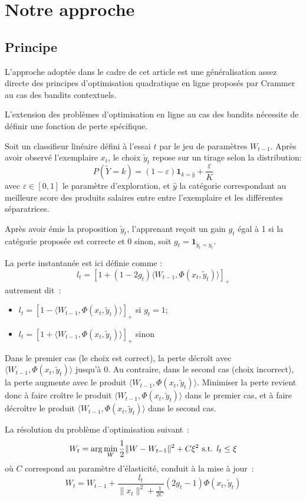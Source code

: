 \documentclass[twocolumn]{article}
\begin{document}
\section{Notre approche}

\subsection{Principe}
L'approche adoptée dans le cadre de cet article est une généralisation assez directe des principes d'optimisation quadratique en ligne proposés par Crammer au cas des bandits contextuels. 

L'extension des problèmes d'optimisation en ligne au cas des bandits nécessite de définir une fonction de perte spécifique. 

Soit un classifieur linéaire défini à l'essai $t$ par le jeu de paramètres $W_{t-1}$. Après avoir observé l'exemplaire $x_t$, le choix $\tilde{y}_t$ repose sur un tirage selon la distribution: $$P(\tilde{Y}=k) = (1 - \varepsilon) \mathbf{1}_{k = \hat{y}} + \frac{\varepsilon}{K} $$ avec $\varepsilon \in [0,1]$ le paramètre d'exploration, et $\hat{y}$ la catégorie correspondant au meilleure score des produits salaires entre entre l'exemplaire et les différentes séparatrices.  

Après avoir émis la proposition $\tilde{y}_t$, l'apprenant reçoit un gain $g_t$ égal à 1 si la catégorie proposée est correcte et 0 sinon, soit $g_t = \mathbf{1}_{\tilde{y}_t=y_t}$. 

La perte instantanée est ici définie comme :
$$l_t = [1 + (1 - 2 g_t) \langle W_{t-1}, \Phi(x_t,\tilde{y}_t)\rangle]_+$$
autrement dit~:
\begin{itemize}
	\item[] $l_t = [1 - \langle W_{t-1}, \Phi(x_t,\tilde{y}_t)\rangle]_+$ si $g_t=1$;
	\item[] $l_t = [1 + \langle W_{t-1}, \Phi(x_t,\tilde{y}_t)\rangle]_+$ sinon
\end{itemize}
Dans le premier cas (le choix est correct), la perte décroît avec $\langle W_{t-1}, \Phi(x_t,\tilde{y}_t)\rangle$ jusqu'à 0. Au contraire, dans le second cas (choix incorrect), la perte augmente avec le produit $\langle W_{t-1}, \Phi(x_t,\tilde{y}_t)\rangle$.
Minimiser la perte revient donc à faire croître le produit $\langle W_{t-1}, \Phi(x_t,\tilde{y}_t)\rangle$ dans le premier cas, et à faire décroître le produit $\langle W_{t-1}, \Phi(x_t,\tilde{y}_t)\rangle$  dans le second cas.

La résolution du problème d'optimisation suivant~:
$$W_{t} = \arg \min_W \frac{1}{2} \| W - W_{t-1}\|^2 + C \xi^2 \hbox{ s.t. } l_t \leq \xi$$
où $C$ correspond au paramètre d'élasticité, conduit à la mise à jour~:
$$W_{t} =  W_{t-1} + \frac{l_t}{\|x_t\|^2 + \frac{1}{2C}} (2g_t - 1) \Phi(x_t,\tilde{y}_t)$$
\end{document}
